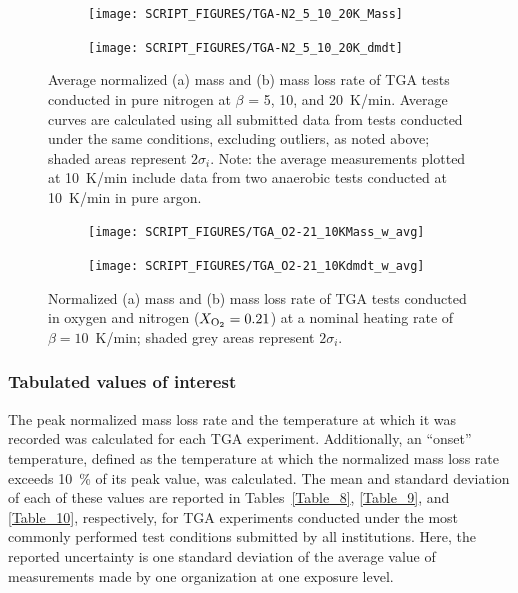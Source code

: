 \documentclass{book}
\begin{document}
\begin{figure}[p]
\centering
\begin{subfigure}[b]{0.9\textwidth}
   \texttt{[image: SCRIPT\_FIGURES/TGA-N2\_5\_10\_20K\_Mass]}
   \caption{}
   \label{Fig:TGA-N2_5_10_20K_Mass}
\end{subfigure}

\begin{subfigure}[b]{0.9\textwidth}
   \texttt{[image: SCRIPT\_FIGURES/TGA-N2\_5\_10\_20K\_dmdt]}
   \caption{}
   \label{Fig:TGA-N2_5_10_20K_dmdt}
\end{subfigure}

  \caption{Average normalized (a) mass and (b) mass loss rate of TGA tests conducted in pure nitrogen at $\beta$ = 5, 10, and 20~K/min. Average curves are calculated using all submitted data from tests conducted under the same conditions, excluding outliers, as noted above; shaded areas represent $2\sigma_i$. Note: the average measurements plotted at 10~K/min include data from two anaerobic tests conducted at 10~K/min in pure argon.}
  \label{Fig:TGA-N2_5_10_20K}
\end{figure}


\begin{figure}[p]
\centering
\begin{subfigure}[b]{0.9\textwidth}
   \texttt{[image: SCRIPT\_FIGURES/TGA\_O2-21\_10KMass\_w\_avg]}
   \caption{}
   \label{Fig:TGA_O2-21_10KMass_w_avg}
\end{subfigure}

\begin{subfigure}[b]{0.9\textwidth}
   \texttt{[image: SCRIPT\_FIGURES/TGA\_O2-21\_10Kdmdt\_w\_avg]}
   \caption{}
   \label{Fig:TGA_O2-21_10Kdmdt_w_avg}
\end{subfigure}

  \caption{Normalized (a) mass and (b) mass loss rate of TGA tests conducted in oxygen and nitrogen ($X_{\rm O_2}=0.21$) at a nominal heating rate of $\beta=10$~K/min; shaded grey areas represent $2\sigma_i$.}
  \label{Fig:TGA_O2-21_10K_w_avg}
\end{figure}

\newpage
\subsubsection{Tabulated values of interest}

The peak normalized mass loss rate and the temperature at which it was recorded was calculated for each TGA experiment. Additionally, an ``onset'' temperature, defined as the temperature at which the normalized mass loss rate exceeds 10~\% of its peak value, was calculated. The mean and standard deviation of each of these values are reported in Tables~\ref{Table_8}, \ref{Table_9}, and \ref{Table_10}, respectively, for TGA experiments conducted under the most commonly performed test conditions submitted by all institutions. Here, the reported uncertainty is one standard deviation of the average value of measurements made by one organization at one exposure level.
\end{document}

